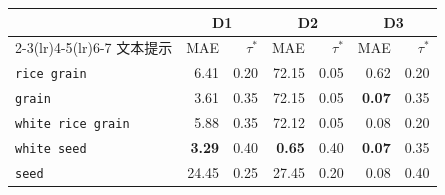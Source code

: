 \begin{tabular}{lrrrrrr}
\toprule
& \multicolumn{2}{c}{D1} & \multicolumn{2}{c}{D2} & \multicolumn{2}{c}{D3} \\
\cmidrule(lr){2-3}\cmidrule(lr){4-5}\cmidrule(lr){6-7}
文本提示 & MAE & $\tau^\ast$ & MAE & $\tau^\ast$ & MAE & $\tau^\ast$ \\
\midrule
\texttt{rice grain} & 6.41 & 0.20 & 72.15 & 0.05 & 0.62 & 0.20 \\
\texttt{grain} & 3.61 & 0.35 & 72.15 & 0.05 & \textbf{0.07} & 0.35 \\
\texttt{white rice grain} & 5.88 & 0.35 & 72.12 & 0.05 & 0.08 & 0.20 \\
\texttt{white seed} & \textbf{3.29} & 0.40 & \textbf{0.65} & 0.40 & \textbf{0.07} & 0.35 \\
\texttt{seed} & 24.45 & 0.25 & 27.45 & 0.20 & 0.08 & 0.40 \\
\bottomrule
\end{tabular}